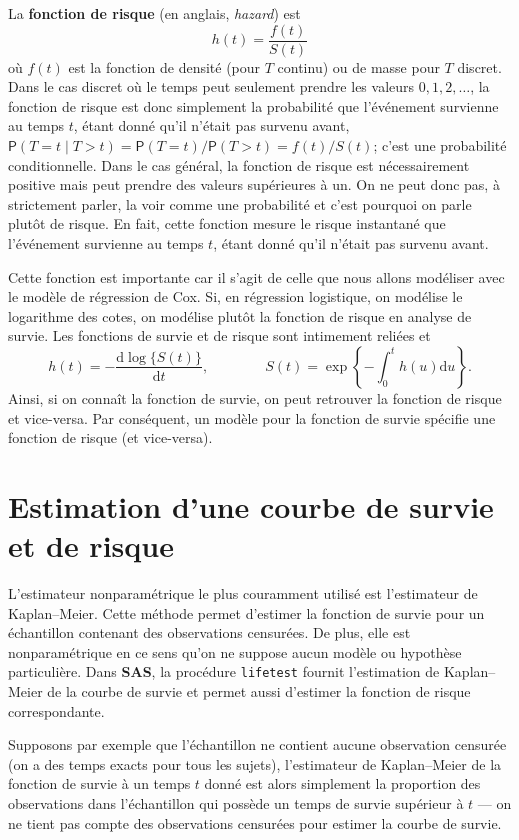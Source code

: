 \documentclass[
  11pt,
  letterpaper,
]{book}
\theoremstyle{definition}
\theoremstyle{definition}
\theoremstyle{definition}
\theoremstyle{remark}
\begin{document}
La \textbf{fonction de risque} (en anglais, \emph{hazard}) est
\[h(t) =  \frac{f(t)}{S(t)}\]
où \(f(t)\) est la fonction de densité (pour \(T\) continu) ou de masse pour \(T\) discret.
Dans le cas discret où le temps peut seulement prendre les valeurs \(0, 1, 2, \ldots\), la fonction de risque est donc simplement la probabilité que l'événement survienne au temps \(t\), étant donné qu'il n'était pas survenu avant, \({\mathsf P}\left(T=t \mid T > t\right) = {\mathsf P}\left(T=t\right) / {\mathsf P}\left(T >t\right) = f(t)/S(t)\); c'est une probabilité conditionnelle. Dans le cas général, la fonction de risque est nécessairement positive mais peut prendre des valeurs supérieures à un. On ne peut donc pas, à strictement parler, la voir comme une probabilité et c'est pourquoi on parle plutôt de risque. En fait, cette fonction mesure le risque instantané que l'événement survienne au temps \(t\), étant donné qu'il n'était pas survenu avant.

Cette fonction est importante car il s'agit de celle que nous allons modéliser avec le modèle de régression de Cox. Si, en régression logistique, on modélise le logarithme des cotes, on modélise plutôt la fonction de risque en analyse de survie.
Les fonctions de survie et de risque sont intimement reliées et
\[ h(t) = - \frac{\mathrm{d}\log\{S(t)\}}{\mathrm{d}t}, \qquad \qquad S(t) = \exp \left\{ -\int_0^t h(u) \mathrm{d}u\right\}. \]
Ainsi, si on connaît la fonction de survie, on peut retrouver la fonction de risque et vice-versa. Par conséquent, un modèle pour la fonction de survie spécifie une fonction de risque (et vice-versa).

\hypertarget{estimation-dune-courbe-de-survie-et-de-risque}{%
\section{Estimation d'une courbe de survie et de risque}\label{estimation-dune-courbe-de-survie-et-de-risque}}

L'estimateur nonparamétrique le plus couramment utilisé est l'estimateur de Kaplan--Meier. Cette méthode permet d'estimer la fonction de survie pour un échantillon contenant des observations censurées. De plus, elle est nonparamétrique en ce sens qu'on ne suppose aucun modèle ou hypothèse particulière. Dans \textbf{SAS}, la procédure \texttt{lifetest} fournit l'estimation de Kaplan--Meier de la courbe de survie et permet aussi d'estimer la fonction de risque correspondante.

Supposons par exemple que l'échantillon ne contient aucune observation censurée (on a des temps exacts pour tous les sujets), l'estimateur de Kaplan--Meier de la fonction de survie à un temps \(t\) donné est alors simplement la proportion des observations dans l'échantillon qui possède un temps de survie supérieur à \(t\) --- on ne tient pas compte des observations censurées pour estimer la courbe de survie.
\end{document}
